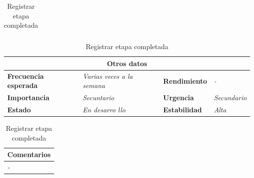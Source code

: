 \documentclass[12pt,spanish]{article}
\begin{document}
\begin{table}[H]
\begin{tabular}{|m{5pt}|m{7.33cm}|m{5pt}|m{7.33cm}|}
	\end{tabular}
	
	\vspace{0.5cm}
	
	\begin{tabular}{|m{3.75cm}|m{3.75cm}|m{3.75cm}|m{3.8cm}|}
		\hline
		\multicolumn{4}{|c|}{\textbf{Otros datos}} \\
		\hline
		\textbf{Frecuencia esperada} & \textit{Varias veces a la semana} & \textbf{Rendimiento} & \textit{-} \\
		\hline
		\textbf{Importancia} & \textit{Secuntario} & \textbf{Urgencia} & \textit{Secundario} \\
		\hline
		\textbf{Estado} & \textit{En desarro
		llo} & \textbf{Estabilidad} & \textit{Alta} \\
		\hline
	\end{tabular}
	
	\vspace{1cm}
	
	\begin{tabular}{|m{16.2cm}|}
		\hline
		\textbf{Comentarios} \\
		\hline
		\textit{-} \\
		\hline
	\end{tabular}
	
	\caption{Registrar etapa completada}
	
\end{table}
\end{document}

